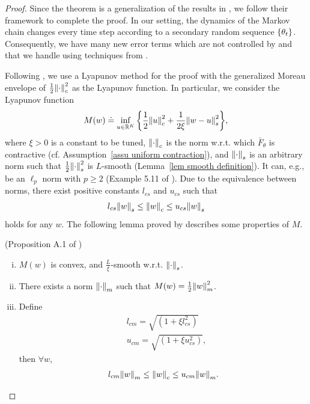 \documentclass[twoside,11pt]{article}
\newcommand{\R}{\mathbb{R}}
\numberwithin{assucounter}{section}
\begin{document}
\thmsaconvergence*
\begin{proof}
Since the theorem is a generalization of the results in \citet{chen2021lyapunov},
we follow their framework to complete the proof.
In our setting,
the dynamics of the Markov chain changes every time step according to a secondary random sequence $\qty{\theta_t}$.
Consequently,
we have many new error terms which are not controlled by \citet{chen2021lyapunov} 
and that we handle using techniques from \citet{zou2019finite}.

Following \citet{chen2021lyapunov},
we use a Lyapunov method for the proof
with the generalized Moreau envelope of $\frac{1}{2}\norm{\cdot}_c^2$ as the Lyapunov function.
In particular,
we consider the Lyapunov function
\begin{align}
  M(w) \doteq \inf_{u\in\R^K}\qty{\frac{1}{2} \norm{u}_c^2 + \frac{1}{2 \xi} \norm{w - u}_s^2},
\end{align}
where
$\xi > 0$ is a constant to be tuned,
$\norm{\cdot}_c$ is the norm w.r.t. which $\bar F_\theta$ is contractive (cf. Assumption~\ref{assu uniform contraction}),
and $\norm{\cdot}_s$ is an arbitrary norm such that $\frac{1}{2}\norm{\cdot}_s^2$ is $L$-smooth (Lemma~\ref{lem smooth definition}).
It can, e.g., be an $\ell_p$ norm with $p \geq 2$ (Example 5.11 of \citet{beck2017first}).
Due to the equivalence between norms,
there exist positive constants $l_{cs}$ and $u_{cs}$ such that 
\begin{align}
  l_{cs} \norm{w}_s \leq \norm{w}_c \leq u_{cs} \norm{w}_s
\end{align}
holds for any $w$.
The following lemma proved by \citet{chen2021lyapunov} describes some properties of $M$.
\begin{lemma}
    (Proposition A.1 of \citet{chen2021lyapunov})
    \label{lem property of M}
    \begin{enumerate}[(i).]
        \item $M(w)$ is convex, and $\frac{L}{\xi}$-smooth w.r.t. $\norm{\cdot}_s$.
        \item There exists a norm $\norm{\cdot}_m$ such that $M(w) = \frac{1}{2}\norm{w}_m^2$.
        \item Define
        \begin{align}
            &l_{cm} = \sqrt{(1 + \xi l_{cs}^2)} \\
            &u_{cm} = \sqrt{(1 + \xi u_{cs}^2)},
        \end{align}
        then $\forall w$,
        \begin{align}
            l_{cm}\norm{w}_m \leq \norm{w}_c \leq u_{cm} \norm{w}_m.

\end{align}
\end{enumerate}
\end{lemma}
\end{proof}
\end{document}
